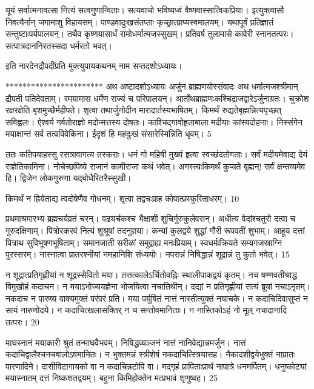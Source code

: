 यूयं सर्वात्मनावत्सा नित्यं सत्वगुणान्विताः।
 सत्यवाचो भविष्यध्वं वैष्णवास्सात्विकप्रियाः।
 इत्युक्त्वासौ निवत्यैर्नान् जगामाशु विहायसम्।
 पाण्डवादुःखसंतप्ताः कृच्छ्रात्प्राप्यस्वमालयम्।
 यथापूर्वं प्रतिज्ञातं सन्तुष्टाःपर्यपालयन्।
 तथैव कृष्णयासार्धं रामोधर्मात्मजस्सुखम्।
 प्रतिवर्ष तुलामासे कावेरी स्नानतत्परः।
 सत्पात्रदाननिरतस्सदा धर्मरतो भवत्।
 
इति नारदेनद्रौपदींप्रति मुक्त्युपायकथनम् नाम
सप्तदशोऽध्यायः।

***********************
अथ अष्टादशोऽध्यायः
अर्जुन ब्राह्मणयोस्संवादः अथ धर्मात्मजश्श्रीमान् द्रौपती पतिदेवताम्।
 रमयामास धर्मेण राज्यं च परिपालयन्।
 आर्तोथब्राह्मणःकश्चिद्राजद्वारेऽर्जुनाग्रतः।
 चुक्रोश रक्षरक्षेति बृशमुच्छैर्महीपते।
 शृत्वा तथार्जुनोदीन मारादार्तस्यभाषितम्।
 किमर्थं रुद्यतेबृह्मन्नित्यपृच्छत् सविह्वलः।
 ऐश्वर्य गर्वतोराज्ञो मदोन्मत्तस्य दोषतः।
 काश्चिद्गावोहृताबाला मदीयाः कांस्यदोहनाः।
 निस्संगेन मयाक्षान्तं सर्व तत्वविवेकिना।
 ईदृशं हि महदुःखं संसारेस्मिन्निति धृवम्।
 5

  ततः कतिपयाहस्सु रसत्रावागत्य तस्कराः।
 धनं गो महिषी मुख्यं हृत्वा स्वच्छंदतोगताः।
 सर्वं मदीयमेवाद्य देयं राज्ञेतिकामिना।
 नोचेच्छपिष्ये राजानं कामीराजा कथं भवेत्।
 अगस्त्यःकिमर्थं कुप्यते बृह्मन्! सर्वं क्षन्तव्यमेव हि।
 द्विजेन लोकगुरुणा यद्बोधैरितरैस्सुखी।
 
किमर्थं न ह्रियेताद्य त्वदोषेणैव गोधनम्।
 शृत्वा तद्वचःप्राह कोपात्प्रस्फुरिताधरम्।
 10

  प्रथमाश्रमारभ्य ब्रह्मचर्यव्रतं चरन्।
 वढ्यर्चकश्च भैक्षाशी शुचिर्गुरुकुलेवसन्।
 अधीत्य वेदांश्चतुरो दत्वा च गुरुदक्षिणाम्।
 पित्रोरकरवं नित्यं शुश्रूषां तदनुज्ञया।
 कन्यां कुलद्वये शुद्धां गौरी रूपवतीं शुभाम्।
 आहूय दत्तां पित्राथ सुविभूषणभूषिताम्।
 समानजाती सरीळां समुद्वाह्य मनःप्रियाम्।
 स्वधर्मःक्रियते सम्यगजस्राग्नि पुरस्सरम्।
 नास्नात्वा प्रातरश्नीयां नमहानिशि संध्ययोः।
 नपरान्नं निषिद्धान्नं शूद्रान्नं तु कुतो भवेत्।
 15

  न शूद्रात्प्रतिगृह्णीयां न शूद्रस्सेवितो मया।
 तत्तत्कालेऽर्चितोवह्निः स्थालीपाकद्वयं कृतम्।
 नच षण्णवतीश्राद्ध विमुखोहं कदाचन।
 न मयाऽभोज्ययज्ञेना भोजयित्वा नचातिथीन्।
 दद्यां न प्रतिगृह्णीयां सत्यं ब्रूयां नचाऽनृतम्।
 नकदाच न पारुष्य वाक्यमुक्तं परंपरं प्रति।
 मया पर्युषितं नात्तं नास्तीत्युक्तं नयाचके।
 न कदाचिदिवासुप्तं न सायं नारुणोदये।
 न कदाचित्खलासक्तिर् न च सन्तोवमानिताः।
 न नास्तिकोऽहं नो मूल् नचादानादि तत्परः।
 20

 
माघस्नानं मयाकारी श्रुतं तन्माघवैभवम्।
 निषिद्धव्यञ्जनं नात्तं नानिवेद्यान्नमर्जुन।
 नात्तं कदाचिद्वालैश्चनचबालोऽवमानितः।
 न भुक्तमन्नं स्त्रीशेषं नकदाचित्स्त्रियासह।
 नैकादशीद्वयेभुक्तं नाप्रातः पारणादिने।
 दासीविटागायको वा न कदाचिन्नटोपि वा।
 मद्गृहं प्रापिताःप्रार्थ नापात्रे धनमर्पितम्।
 धनुष्कोट्यां मयास्नातम् दत्तं निष्कशतद्वयम्।
 बहुना किमिहोक्तेन मत्प्रभावं शृणुष्वह।
 25

